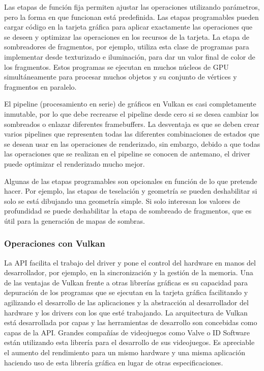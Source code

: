 \documentclass[a4paper, 17pt]{book}
\begin{document}
Las etapas de función fija permiten ajustar las operaciones utilizando parámetros, pero la forma en que funcionan está predefinida.
Las etapas programables pueden cargar código en la tarjeta gráfica para aplicar exactamente las operaciones que se deseen y
optimizar las operaciones en los recursos de la tarjeta.  La etapa de sombreadores de fragmentos, por ejemplo, utiliza esta
clase de programas para implementar desde texturizado e iluminación, para dar un valor final de color de los fragmentos.
Estos programas se ejecutan en muchos núcleos de GPU simultáneamente para procesar muchos objetos y su conjunto de vértices
y fragmentos en paralelo.

\vspace{1mm} %

El pipeline (procesamiento en serie) de gráficos en Vulkan es casi completamente inmutable, por lo que debe recrearse el
pipeline desde cero si se desea cambiar los sombreados o enlazar diferentes framebuffers. La desventaja es que se deben
crear varios pipelines que representen todas las diferentes combinaciones de estados que se desean usar en las operaciones
de renderizado, sin embargo, debido a que todas las operaciones que se realizan en el pipeline se conocen de antemano,
el driver puede optimizar el renderizado mucho mejor.

\vspace{1mm} %

Algunas de las etapas programables son opcionales en función de lo que pretende hacer. Por ejemplo, las etapas de
teselación y geometría se pueden deshabilitar si solo se está dibujando una geometría simple. Si solo interesan
los valores de profundidad se puede deshabilitar la etapa de sombreado de fragmentos, que es útil para la generación
de mapas de sombras.

\subsubsection{Operaciones con Vulkan} 
\label{subsubsec:OpVulkan}

La API facilita el trabajo del driver y pone el control del hardware en manos del desarrollador, por ejemplo,
en la sincronización y la gestión de la memoria. Una de las ventajas de Vulkan frente a otras librerías gráficas
es su capacidad para depuración de los programas que se ejecutan en la tarjeta gráfica facilitando y agilizando
el desarrollo de las aplicaciones y la abstracción al desarrollador del hardware y los drivers con los que esté
trabajando. La arquitectura de Vulkan está desarrollada por capas y las herramientas de desarrollo son concebidas
como capas de la API. Grandes compañías de videojuegos como Valve o ID Software están utilizando esta librería
para el desarrollo de sus videojuegos. Es apreciable el aumento del rendimiento para un mismo hardware y una misma
aplicación haciendo uso de esta librería gráfica en lugar de otras especificaciones. 
\end{document}
